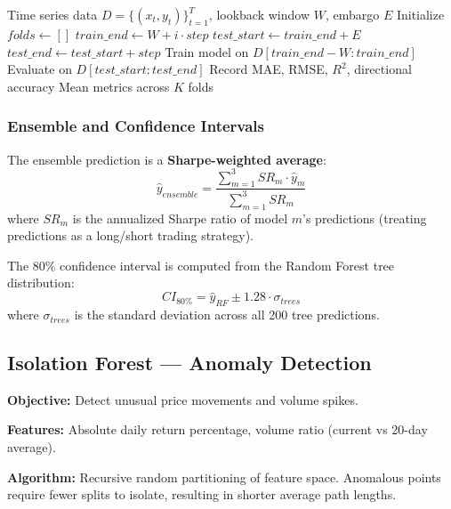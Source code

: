 \documentclass[12pt, a4paper, oneside]{report}
\begin{document}
\begin{algorithm}[H]
\caption{Walk-Forward Cross-Validation with Embargo}
\label{alg:walkforward}
\begin{algorithmic}[1]
\REQUIRE Time series data $D = \{(x_t, y_t)\}_{t=1}^{T}$, lookback window $W$, embargo $E$
\STATE Initialize $folds \leftarrow []$
    \STATE $train\_end \leftarrow W + i \cdot step$
    \STATE $test\_start \leftarrow train\_end + E$ 
    \STATE $test\_end \leftarrow test\_start + step$
    \STATE Train model on $D[train\_end - W : train\_end]$
    \STATE Evaluate on $D[test\_start : test\_end]$
    \STATE Record MAE, RMSE, $R^2$, directional accuracy
\ENDFOR
\RETURN Mean metrics across $K$ folds
\end{algorithmic}
\end{algorithm}

\subsubsection{Ensemble and Confidence Intervals}

The ensemble prediction is a \textbf{Sharpe-weighted average}:
\begin{equation}
    \hat{y}_{ensemble} = \frac{\sum_{m=1}^{3} SR_m \cdot \hat{y}_m}{\sum_{m=1}^{3} SR_m}
\end{equation}
where $SR_m$ is the annualized Sharpe ratio of model $m$'s predictions (treating predictions as a long/short trading strategy).

The 80\% confidence interval is computed from the Random Forest tree distribution:
\begin{equation}
    CI_{80\%} = \hat{y}_{RF} \pm 1.28 \cdot \sigma_{trees}
\end{equation}
where $\sigma_{trees}$ is the standard deviation across all 200 tree predictions.

\subsection{Isolation Forest --- Anomaly Detection}

\textbf{Objective:} Detect unusual price movements and volume spikes.

\textbf{Features:} Absolute daily return percentage, volume ratio (current vs 20-day average).

\textbf{Algorithm:} Recursive random partitioning of feature space. Anomalous points require fewer splits to isolate, resulting in shorter average path lengths.
\end{document}
